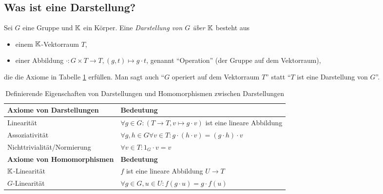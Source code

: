 
\subsection{Was ist eine Darstellung?}

\begin{definition}[Darstellungen]\label{darstellungen:def}
Sei $G$ eine Gruppe und $\mathbb{K}$ ein Körper. Eine \emph{Darstellung von $G$ über $\mathbb{K}$} besteht aus
\begin{itemize}
	\item einem $\mathbb{K}$-Vektorraum $T$,
	\item einer Abbildung $\cdot: G \times T \to T, (g,t) \mapsto g\cdot t$, genannt \enquote{Operation} (der Gruppe auf dem Vektorraum),
\end{itemize}
die die Axiome in Tabelle \ref{darstellungen:def_table} erfüllen. Man sagt auch \enquote{$G$ operiert auf dem Vektorraum $T$} statt \enquote{$T$ ist eine Darstellung von $G$}.

\begin{table}[!ht]
	\setlength\extrarowheight{10pt} %
	\begin{tabularx}{\textwidth}{p{7cm} X}
		
		\toprule
		\textbf{Axiome von Darstellungen}                    & \textbf{Bedeutung} \\
		\midrule
        \hspace{1cm}Linearität                               & $\forall g\in G: (T\to T, v\mapsto g\cdot v)$ ist eine lineare Abbildung \\
		\hspace{1cm}Assoziativität                           & $\forall g,h\in G\forall v\in T: g\cdot (h\cdot v)=(g\cdot h)\cdot v$  \\
		\hspace{1cm}Nichttrivialität/Normierung              & $\forall v\in T: 1_G\cdot v=v$  \\
		\textbf{Axiome von Homomorphismen}                   & \textbf{Bedeutung} \\
        \midrule
        \hspace{1cm}$\mathbb{K}$-Linearität & $f$ ist eine lineare Abbildung $U \to T$ \\
        \hspace{1cm}$G$-Linearität & $\forall g\in G, u\in U: f(g\cdot u) = g\cdot f(u)$ \\
        \bottomrule
	\end{tabularx}
	\caption{Definierende Eigenschaften von Darstellungen und Homomorphismen zwischen Darstellungen}
    \label{darstellungen:def_table}
\end{table}


\end{definition}
